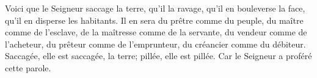Voici que le Seigneur saccage la terre, qu’il la ravage,
	qu’il en bouleverse la face, qu’il en disperse les habitants.
Il en sera du prêtre comme du peuple, du maître comme de l’esclave,
	de la maîtresse comme de la servante, du vendeur comme de l’acheteur,
	du prêteur comme de l’emprunteur, du créancier comme du débiteur.
Saccagée, elle est saccagée, la terre; pillée, elle est pillée.
	Car le Seigneur a proféré cette parole.
